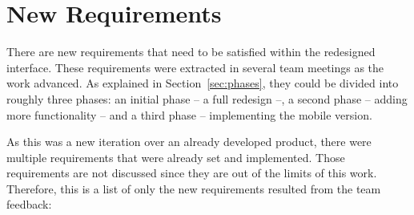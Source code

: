 \section{New Requirements} %
\label{sec:new_requirements}

There are new requirements that need to be satisfied within the redesigned  interface.
These requirements were extracted in several team meetings as the work advanced.
As explained in Section~\ref{sec:phases}, they could be divided into roughly three phases: an initial phase -- a full redesign --, a second phase -- adding more functionality -- and a third phase -- implementing the mobile version.

As this was a new iteration over an already developed product, there were multiple requirements that were already set and implemented.
Those requirements are not discussed since they are out of the limits of this work.
Therefore, this is a list of only the new requirements resulted from the team feedback:

\begin{center}
  \begin{userrequirement}
    \label{tab:requirementredesign}%
  \end{userrequirement}
\end{center}

\begin{center}
  \begin{userrequirement}
    \label{tab:requirementreadapt}%
  \end{userrequirement}
\end{center}

\begin{center}
  \begin{userrequirement}
    \label{tab:requirementdevicename}%
  \end{userrequirement}
\end{center}

